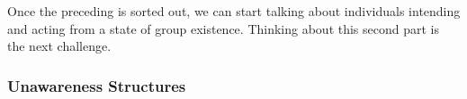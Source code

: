 \documentclass[
11pt,
titlepage,
reqno,
]{article}%
\theoremstyle{definition}
\begin{document}
	Once the preceding is sorted out, we can start talking about individuals intending and acting from a state of group existence. Thinking about this second part is the next challenge. %
	
	
	
	
	
	\subsubsection{Unawareness Structures}
	
\end{document}
